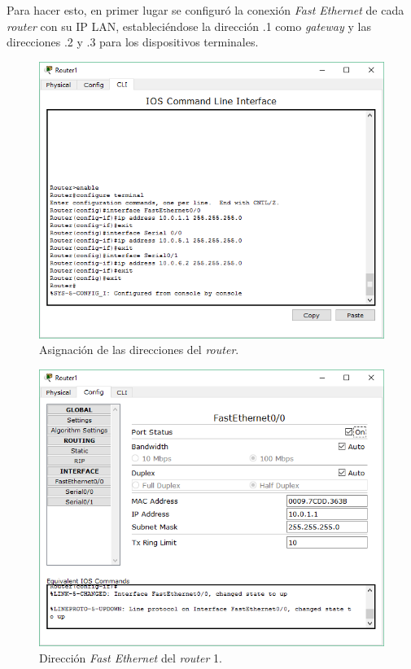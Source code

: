 \documentclass[spanish]{udpreport}
\begin{document}
Para hacer esto, en primer lugar se configuró la conexión\textit{ Fast Ethernet }de cada \textit{router} con su IP LAN, estableciéndose la dirección .1 como \textit{gateway} y las direcciones .2 y .3 para los dispositivos terminales.\\

\begin{figure}[H]
	\begin{center}
		\includegraphics[width= 12.5cm]{Imagenes/configuracion_IPs}
		\caption{Asignación de las direcciones del \textit{router}.}
	\end{center}
\end{figure}

\begin{figure}[H]
	\begin{center}
		\includegraphics[width= 12.5cm]{Imagenes/FE0}
		\caption{Dirección \textit{Fast Ethernet} del \textit{router} 1.}
	\end{center}
\end{figure}
\end{document}
